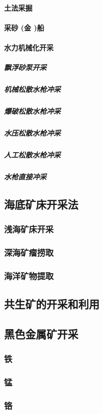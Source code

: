 \documentclass[UTF8]{../../ApplicationUniverse}
\begin{document}
            \paragraph{土法采掘}
            \paragraph{采砂 (金 )船}
            \paragraph{水力机械化开采}
                \subparagraph{飘浮砂泵开采}
                \subparagraph{机械松散水枪冲采}
                \subparagraph{爆破松散水枪冲采}
                \subparagraph{水压松散水枪冲采}
                \subparagraph{人工松散水枪冲采}
                \subparagraph{水枪直接冲采}
    \subsection{海底矿床开采法}
        \subsubsection{浅海矿床开采}
        \subsubsection{深海矿瘤捞取}
        \subsubsection{海洋矿物提取}
    \subsection{共生矿的开采和利用}
    \subsection{黑色金属矿开采}
        \subsubsection{铁}
        \subsubsection{锰}
        \subsubsection{铬}
\end{document}
